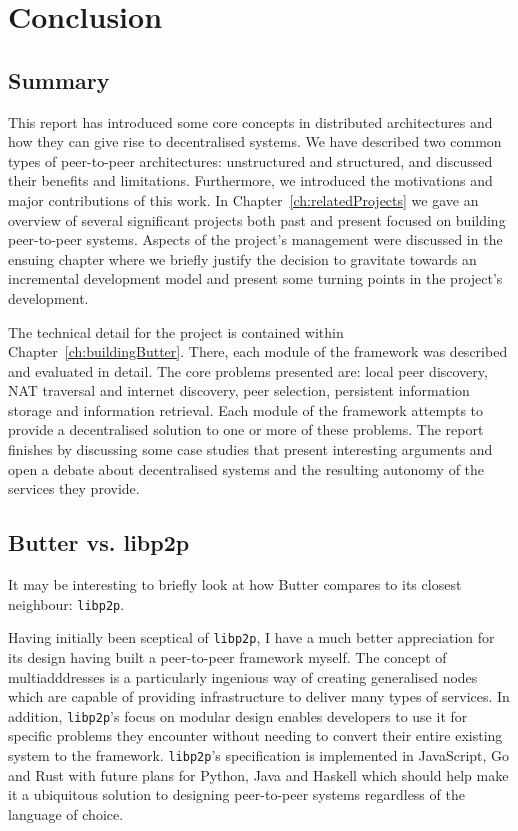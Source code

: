 \chapter{Conclusion}
\label{ch:conclusion}


\section{Summary}
\label{sec:summary}

This report has introduced some core concepts in distributed architectures and how they can give rise to decentralised systems. We have described two common types of peer-to-peer architectures: unstructured and structured, and discussed their benefits and limitations. Furthermore, we introduced the motivations and major contributions of this work. In Chapter~\ref{ch:relatedProjects} we gave an overview of several significant projects both past and present focused on building peer-to-peer systems. Aspects of the project's management were discussed in the ensuing chapter where we briefly justify the decision to gravitate towards an incremental development model and present some turning points in the project's development.

The technical detail for the project is contained within Chapter~\ref{ch:buildingButter}. There, each module of the framework was described and evaluated in detail. The core problems presented are: local peer discovery, NAT traversal and internet discovery, peer selection, persistent information storage and information retrieval. Each module of the framework attempts to provide a decentralised solution to one or more of these problems. The report finishes by discussing some case studies that present interesting arguments and open a debate about decentralised systems and the resulting autonomy of the services they provide.


\section{Butter vs. libp2p}

It may be interesting to briefly look at how Butter compares to its closest neighbour: \verb+libp2p+.

Having initially been sceptical of \verb+libp2p+, I have a much better appreciation for its design having built a peer-to-peer framework myself. The concept of multiadddresses is a particularly ingenious way of creating generalised nodes which are capable of providing infrastructure to deliver many types of services. In addition, \verb+libp2p+'s focus on modular design enables developers to use it for specific problems they encounter without needing to convert their entire existing system to the framework. \verb+libp2p+'s specification is implemented in JavaScript, Go and Rust with future plans for Python, Java and Haskell which should help make it a ubiquitous solution to designing peer-to-peer systems regardless of the language of choice\cite{protocollabs2022implementations}.

